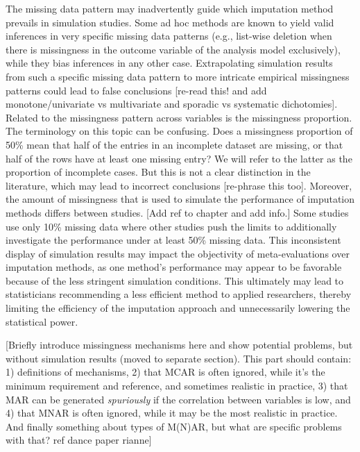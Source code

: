 \documentclass[bimj,fleqn]{w-art}
\theoremstyle{plain}
\theoremstyle{definition}
\begin{document}

The missing data pattern may inadvertently guide which imputation method prevails in simulation studies. Some ad hoc methods are known to yield valid inferences in very specific missing data patterns (e.g., list-wise deletion when there is missingness in the outcome variable of the analysis model exclusively), while they bias inferences in any other case. Extrapolating simulation results from such a specific missing data pattern to more intricate empirical missingness patterns could lead to false conclusions [re-read this! and add monotone/univariate vs multivariate and sporadic vs systematic dichotomies]. Related to the missingness pattern across variables is the missingness proportion. The terminology on this topic can be confusing. Does a missingness proportion of 50\% mean that half of the entries in an incomplete dataset are missing, or that half of the rows have at least one missing entry? We will refer to the latter as the proportion of incomplete cases. But this is not a clear distinction in the literature, which may lead to incorrect conclusions [re-phrase this too]. Moreover, the amount of missingness that is used to simulate the performance of imputation methods differs between studies. [Add ref to chapter \citep{liu21} and add info.] Some studies use only 10\% missing data where other studies push the limits to additionally investigate the performance under at least 50\% missing data. This inconsistent display of simulation results may impact the objectivity of meta-evaluations over imputation methods, as one method's performance may appear to be favorable because of the less stringent simulation conditions. This ultimately may lead to statisticians recommending a less efficient method to applied researchers, thereby limiting the efficiency of the imputation approach and unnecessarily lowering the statistical power.

[Briefly introduce missingness mechanisms here and show potential problems, but without simulation results (moved to separate section). This part should contain: 1) definitions of mechanisms, 2) that MCAR is often ignored, while it's the minimum requirement and reference, and sometimes realistic in practice, 3) that MAR can be generated \emph{spuriously} if the correlation between variables is low, and 4) that MNAR is often ignored, while it may be the most realistic in practice. And finally something about types of M(N)AR, but what are specific problems with that? ref dance paper rianne]
\end{document}
